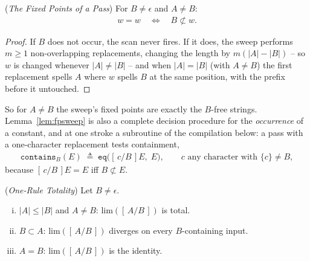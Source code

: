 \documentclass[runningheads,envcountsect]{llncs}
\begin{document}
\begin{lemma}
    (\emph{The Fixed Points of a Pass})
    \label{lem:fpsweep}
    For $B \neq \epsilon$ and $A \neq B$:
    \begin{align}
        [\,A/B\,]w = w \quad\Longleftrightarrow\quad B \not\subset w .
    \end{align}
\end{lemma}

\begin{proof}
    If $B$ does not occur, the scan never fires. If it does, the sweep
    performs $m \geq 1$ non-overlapping replacements, changing the length
    by $m(|A| - |B|)$ -- so $w$ is changed whenever $|A| \neq |B|$ -- and
    when $|A| = |B|$ (with $A \neq B$) the first replacement spells $A$
    where $w$ spells $B$ at the same position, with the prefix before it
    untouched.
\end{proof}

So for $A \neq B$ the sweep's fixed points are exactly the $B$-free
strings. Lemma~\ref{lem:fpsweep} is also a complete decision
procedure for the \emph{occurrence} of a constant, and at one stroke a
subroutine of the compilation below: a pass with a one-character
replacement tests containment,
\begin{align}
    \mathtt{contains}_B(E) \;\triangleq\; \mathtt{eq}\big([\,c/B\,]E,\; E\big),
    \qquad c \text{ any character with } \{c\} \neq B,
    \label{eq:contains}
\end{align}
because $[\,c/B\,]E = E$ iff $B \not\subset E$.

\begin{proposition}
    (\emph{One-Rule Totality})
    \label{prop:limtotal}
    Let $B \neq \epsilon$.
    \begin{enumerate}[(i)]
        \item $|A| \leq |B|$ and $A \neq B$: $\mathrm{lim}([\,A/B\,])$ is total.
        \item $B \subset A$: $\mathrm{lim}([\,A/B\,])$ diverges on every $B$-containing input.
        \item $A = B$: $\mathrm{lim}([\,A/B\,])$ is the identity.
    \end{enumerate}
\end{proposition}
\end{document}
